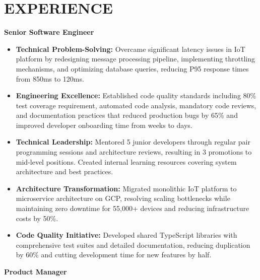 \documentclass{fullstackdeveloper-ats}
\begin{document}
\section{EXPERIENCE}

\noindent\textbf{Senior Software Engineer} \hfill {}\\

\begin{itemize}
    \item \textbf{Technical Problem-Solving:} Overcame significant latency issues in IoT platform by redesigning message processing pipeline, implementing throttling mechanisms, and optimizing database queries, reducing P95 response times from 850ms to 120ms.
    
    \item \textbf{Engineering Excellence:} Established code quality standards including 80\% test coverage requirement, automated code analysis, mandatory code reviews, and documentation practices that reduced production bugs by 65\% and improved developer onboarding time from weeks to days.
    
    \item \textbf{Technical Leadership:} Mentored 5 junior developers through regular pair programming sessions and architecture reviews, resulting in 3 promotions to mid-level positions. Created internal learning resources covering system architecture and best practices.
    
    \item \textbf{Architecture Transformation:} Migrated monolithic IoT platform to microservice architecture on GCP, resolving scaling bottlenecks while maintaining zero downtime for 55,000+ devices and reducing infrastructure costs by 50\%.
    
    \item \textbf{Code Quality Initiative:} Developed shared TypeScript libraries with comprehensive test suites and detailed documentation, reducing duplication by 60\% and cutting development time for new features by half.
\end{itemize}

\vspace{0.2cm}

\noindent\textbf{Product Manager} \hfill {}\\
\end{document}
